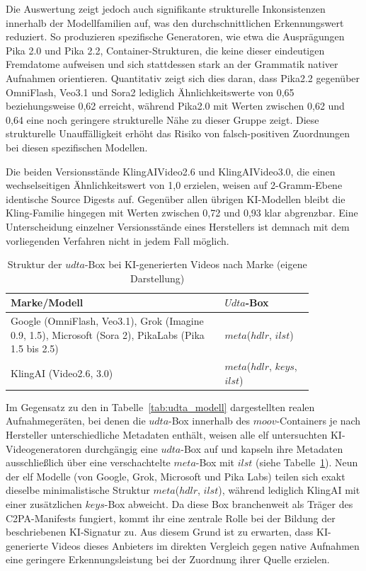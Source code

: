 Die Auswertung zeigt jedoch auch signifikante strukturelle Inkonsistenzen innerhalb der Modellfamilien auf, was den durchschnittlichen Erkennungswert reduziert. So produzieren spezifische Generatoren, wie etwa die Ausprägungen Pika 2.0 und Pika 2.2, Container-Strukturen, die keine dieser eindeutigen Fremdatome aufweisen und sich stattdessen stark an der Grammatik nativer Aufnahmen orientieren. Quantitativ zeigt sich dies daran, dass Pika2.2 gegenüber OmniFlash, Veo3.1 und Sora2 lediglich Ähnlichkeitswerte von 0,65 beziehungsweise 0,62 erreicht, während Pika2.0 mit Werten zwischen 0,62 und 0,64 eine noch geringere strukturelle Nähe zu dieser Gruppe zeigt. Diese strukturelle Unauffälligkeit erhöht das Risiko von falsch-positiven Zuordnungen bei diesen spezifischen Modellen.

Die beiden Versionsstände KlingAIVideo2.6 und KlingAIVideo3.0, die einen wechselseitigen Ähnlichkeitswert von 1,0 erzielen, weisen auf 2-Gramm-Ebene identische Source Digests auf. Gegenüber allen übrigen KI-Modellen bleibt die Kling-Familie hingegen mit Werten zwischen 0,72 und 0,93 klar abgrenzbar. Eine Unterscheidung einzelner Versionsstände eines Herstellers ist demnach mit dem vorliegenden Verfahren nicht in jedem Fall möglich.

\begin{table}[H]
\centering
\begin{tabular}{>{\raggedright\arraybackslash}p{0.6\linewidth}>{\raggedright\arraybackslash}p{0.25\linewidth}}
\toprule
\textbf{Marke/Modell} & \textbf{\(Udta\)-Box} \\
\midrule
Google (OmniFlash, Veo3.1), Grok (Imagine 0.9, 1.5), Microsoft (Sora 2), PikaLabs (Pika 1.5 bis 2.5)& \(meta\)(\(hdlr\), \(ilst\)) \\
\midrule
KlingAI (Video2.6, 3.0)& \(meta\)(\(hdlr\), \(keys\), \(ilst\)) \\
\bottomrule
\end{tabular}
\caption{Struktur der \(udta\)-Box bei KI-generierten Videos nach Marke (eigene Darstellung)}
\label{tab:udta_ki_modell}
\end{table}

Im Gegensatz zu den in Tabelle~\ref{tab:udta_modell} dargestellten realen Aufnahmegeräten, bei denen die \(udta\)-Box innerhalb des \(moov\)-Containers je nach Hersteller unterschiedliche Metadaten enthält, weisen alle elf untersuchten KI-Videogeneratoren durchgängig eine \(udta\)-Box auf und kapseln ihre Metadaten ausschließlich über eine verschachtelte \(meta\)-Box mit \(ilst\) (siehe Tabelle~\ref{tab:udta_ki_modell}). Neun der elf Modelle (von Google, Grok, Microsoft und Pika Labs) teilen sich exakt dieselbe minimalistische Struktur \(meta\)(\(hdlr\), \(ilst\)), während lediglich KlingAI mit einer zusätzlichen \(keys\)-Box abweicht. Da diese Box branchenweit als Träger des C2PA-Manifests fungiert, kommt ihr eine zentrale Rolle bei der Bildung der beschriebenen KI-Signatur zu. Aus diesem Grund ist zu erwarten, dass KI-generierte Videos dieses Anbieters im direkten Vergleich gegen native Aufnahmen eine geringere Erkennungsleistung bei der Zuordnung ihrer Quelle erzielen.

